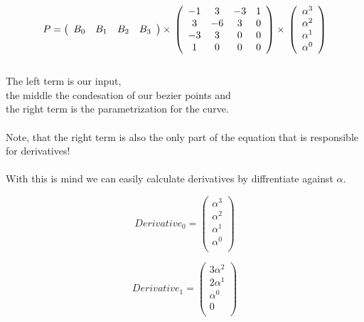 \begin{equation*}
    P=\left(
    \begin{array}{cccc}
        B_0 & B_1 & B_2 & B_3 \\
    \end{array}
    \right)
    \times \\
    \left(
    \begin{array}{cccc}
        -1 & 3  & -3 & 1 \\
        3  & -6 & 3  & 0 \\
        -3 & 3  & 0  & 0 \\
        1  & 0  & 0  & 0 \\
    \end{array}
    \right)
    \times \\
    \left(
    \begin{array}{cccc}
        \alpha ^3 \\
        \alpha ^2 \\
        \alpha ^1 \\
        \alpha ^0 \\
    \end{array}
    \right)
\end{equation*}
\\
The left term is our input,
\\
the middle the condesation of our bezier points and
\\
the right term is the parametrization for the curve.
\\\\
Note, that the right term is also the only part of the equation that is responsible for derivatives!
\\\\
With this is mind we can easily calculate derivatives by diffrentiate against $\alpha$.

\begin{equation}
    Derivative_0=\left(
    \begin{array}{cccc}
        \alpha ^3 \\
        \alpha ^2 \\
        \alpha ^1 \\
        \alpha ^0 \\
    \end{array}
    \right)
\end{equation}

\begin{equation}
    Derivative_1=\left(
    \begin{array}{cccc}
        3 \alpha ^2 \\
        2 \alpha ^1 \\
        \alpha ^0   \\
        0           \\
    \end{array}
    \right)
\end{equation}


